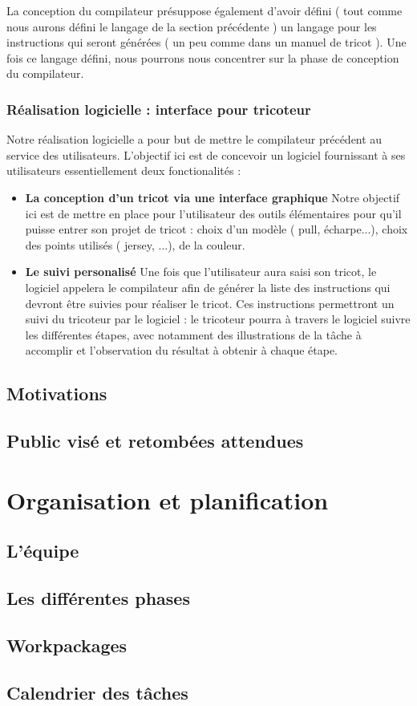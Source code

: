 \documentclass{article}
\begin{document}
La conception du compilateur présuppose également d'avoir défini ( tout comme nous aurons défini le langage de la section précédente ) un 
langage pour les instructions qui seront générées ( un peu comme dans un manuel de tricot ). 
Une fois ce langage défini, nous pourrons nous concentrer sur la phase de conception du compilateur. 

\subsubsection{Réalisation logicielle : interface pour tricoteur}

Notre réalisation logicielle a pour but de mettre le compilateur précédent au service des utilisateurs. 
L'objectif ici est de concevoir un logiciel fournissant à ses utilisateurs essentiellement deux fonctionalités :
\begin{itemize} 
  \item \textbf{La conception d'un tricot via une interface graphique} Notre objectif ici est de mettre en place pour l'utilisateur des
  outils élémentaires pour qu'il puisse entrer son projet de tricot : choix d'un modèle ( pull, écharpe...), choix des points utilisés 
  ( jersey, ...), de la couleur.
  \item \textbf{Le suivi personalisé} Une fois que l'utilisateur aura saisi son tricot, le logiciel appelera le compilateur afin de générer 
la liste des instructions qui devront être suivies pour réaliser le tricot. Ces instructions permettront un suivi du tricoteur par le 
logiciel : le tricoteur pourra à travers le logiciel suivre les différentes étapes, avec notamment des illustrations de la tâche à 
accomplir et l'observation du résultat à obtenir à chaque étape.
\end{itemize}

\subsection{Motivations}

\subsection{Public visé et retombées attendues}

\section{Organisation et planification}

\subsection{L'équipe} 

\subsection{Les différentes phases}

\subsection{Workpackages}

\subsection{Calendrier des tâches}
\end{document}
